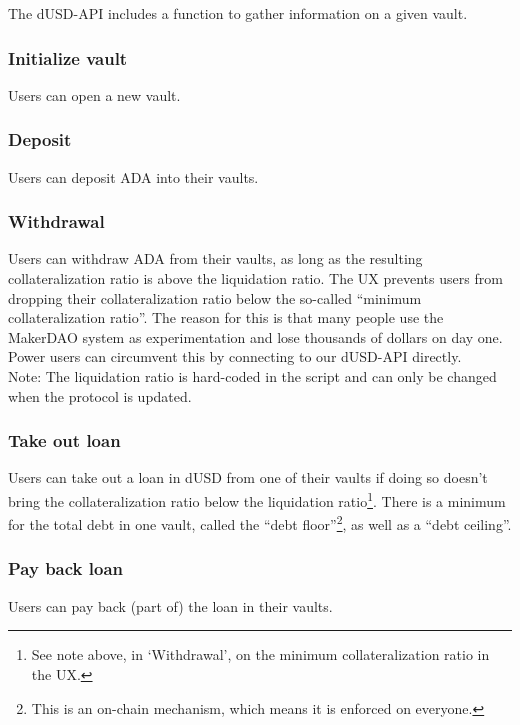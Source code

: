 \documentclass{article} %
\begin{document}
The dUSD-API includes a function to gather information on a given vault.

\subsubsection*{Initialize vault}

Users can open a new vault.

\subsubsection*{Deposit}

Users can deposit ADA into their vaults.

\subsubsection*{Withdrawal}

Users can withdraw ADA from their vaults, as long as the resulting
collateralization ratio is above the liquidation ratio. The UX prevents users
from dropping their collateralization ratio below the so-called ``minimum
collateralization ratio''. The reason for this is that many people use the
MakerDAO system as experimentation and lose thousands of dollars on day one.
Power users can circumvent this by connecting to our dUSD-API directly. \\

Note: The liquidation ratio is hard-coded in the script and can only be changed
when the protocol is updated.

\subsubsection*{Take out loan}

Users can take out a loan in dUSD from one of their vaults if doing so doesn't
bring the collateralization ratio below the liquidation ratio\footnote{
  See note above, in `Withdrawal', on the minimum collateralization ratio in the
  UX.}.
There is a minimum for the total debt in one vault, called the ``debt
floor''\footnote{
  This is an on-chain mechanism, which means it is enforced on everyone.
}, as well as a ``debt ceiling''.

\subsubsection*{Pay back loan}

Users can pay back (part of) the loan in their vaults.
\end{document}
